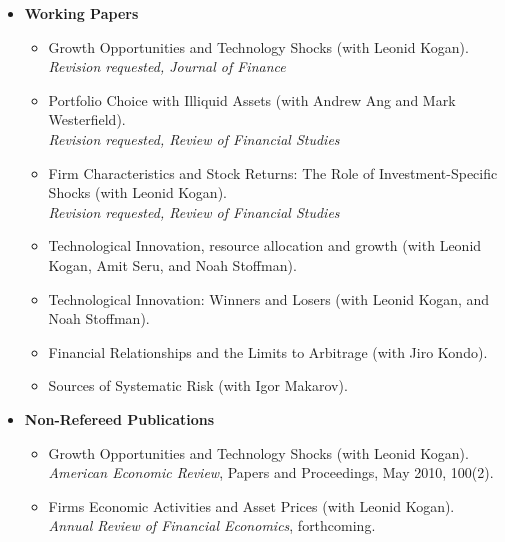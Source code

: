 \documentclass[11pt,letterpaper,overlapped]{res}
\begin{document}
\begin{resume}
\begin{itemize}
\item \textbf{Working Papers}
\begin{itemize}
\item Growth Opportunities and Technology Shocks (with Leonid Kogan).\\
\emph{Revision requested, Journal of Finance}
\item Portfolio Choice with Illiquid Assets (with Andrew Ang and Mark Westerfield).\\
\emph{Revision requested, Review of Financial Studies}
\item Firm Characteristics and Stock Returns: The Role of Investment-Specific Shocks (with Leonid Kogan).\\
\emph{Revision requested, Review of Financial Studies}
\item Technological Innovation, resource allocation and growth (with Leonid Kogan, Amit Seru, and Noah Stoffman).
\item Technological Innovation: Winners and Losers (with Leonid Kogan, and Noah Stoffman).
\item Financial Relationships and the Limits to Arbitrage (with Jiro Kondo).
\item Sources of Systematic Risk (with Igor Makarov).
\end{itemize}
\vspace{0.5cm}
\item \textbf{Non-Refereed Publications}
\begin{itemize}
\item Growth Opportunities and Technology Shocks (with Leonid Kogan). \\
\emph{American Economic Review}, Papers and Proceedings, May 2010, 100(2).
\item Firms Economic Activities and Asset Prices (with Leonid Kogan). \\
\emph{Annual Review of Financial Economics}, forthcoming.
\end{itemize}
\vspace{0.5cm}


\end{itemize}
\end{resume}
\end{document}
